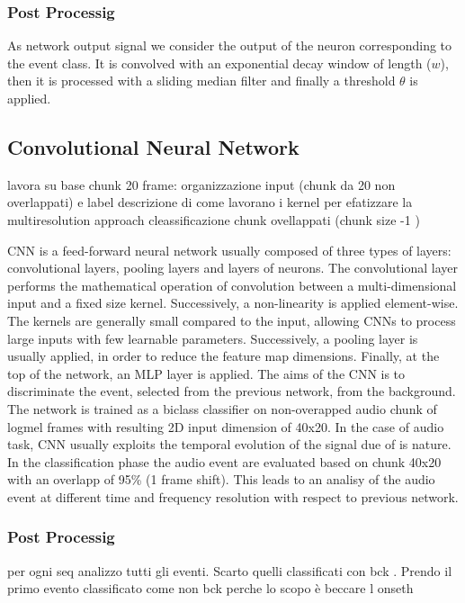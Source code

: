 \documentclass{article}
\begin{document}
\begin{sloppy}
\subsubsection{Post Processig}
As network output signal we consider the output of the neuron corresponding to the event class. It is convolved with an exponential decay window of length ($w$), then it is processed with a sliding median filter and finally a threshold $\theta$ is applied.

\subsection{Convolutional Neural Network}
lavora su base chunk 20 frame: organizzazione input (chunk da 20 non overlappati) e label 
descrizione di come lavorano i kernel per efatizzare la multiresolution approach
cleassificazione chunk ovellappati (chunk size -1 )

CNN is a feed-forward neural network \cite{Yann-cnn-1998} usually composed of three types of layers: convolutional layers, pooling layers and layers of neurons. The convolutional layer performs the mathematical operation of convolution between a multi-dimensional input and a fixed size kernel. Successively, a non-linearity is applied element-wise. The kernels are generally small compared to the input, allowing CNNs to process large inputs with few learnable parameters. Successively, a pooling layer is usually applied, in order to reduce the feature map dimensions. Finally, at the top of the network, an MLP layer is applied.
The aims of the CNN is to discriminate the event, selected from the previous network, from the background. The network is trained as a biclass classifier on non-overapped audio chunk of logmel frames with resulting 2D input dimension of 40x20. In the case of audio task, CNN usually exploits the temporal evolution of the signal \cite{thomas2014analyzing} due of is nature. 
In the classification phase the audio event are evaluated based on chunk 40x20 with an overlapp of 95\% (1 frame shift). This leads to an analisy of the audio event at different time and frequency resolution with respect to previous network. 
\subsubsection{Post Processig }
per ogni seq analizzo tutti gli eventi. Scarto quelli classificati con bck . Prendo il primo evento classificato come non bck perche lo scopo è beccare l onseth

\end{sloppy}
\end{document}
